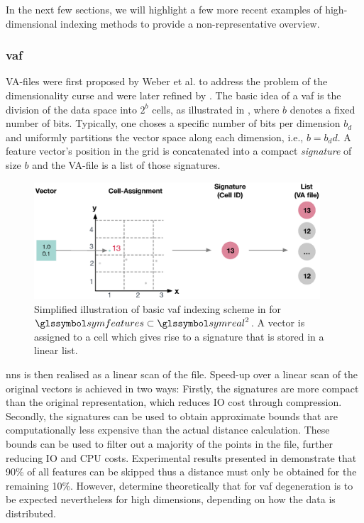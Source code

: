 In the next few sections, we will highlight a few more recent examples of high-dimensional indexing methods to provide a non-representative overview.

\subsubsection{\acrfull{vaf}}

VA-files were first proposed by Weber et al. \cite{Weber:1998Va} to address the problem of the dimensionality curse and were later refined by \cite{Ferhatosmanoglu:2000Vector}. The basic idea of a \acrshort{vaf} is the division of the data space into $2^b$ cells, as illustrated in , where $b$ denotes a fixed number of bits. Typically, one choses a specific number of bits per dimension $b_d$ and uniformly partitions the vector space along each dimension, i.e., $b = b_dd$. A feature vector's position in the grid is concatenated into a compact \emph{signature} of size $b$ and the VA-file is a list of those signatures. 

\begin{figure}[bt]
\centering
\includegraphics[width=0.95\textwidth]{figures/vaf}
\caption{Simplified illustration of basic \acrshort{vaf} indexing scheme in for $\symfeatures \subset \symreal^2$. A vector is assigned to a cell which gives rise to a signature that is stored in a linear list.}
\label{fig:vaf}
\end{figure}

\acrshort{nns} is then realised as a linear scan of the file. Speed-up over a linear scan of the original vectors is achieved in two ways: Firstly, the signatures are more compact than the original representation, which reduces IO cost through compression. Secondly, the signatures can be used to obtain approximate bounds that are computationally less expensive than the actual distance calculation. These bounds can be used to filter out a majority of the points in the file, further reducing IO and CPU costs. Experimental results presented in \cite{Weber:1998Va} demonstrate that 90\% of all features can be skipped thus a distance must only be obtained for the remaining 10\%. However, \cite{Echihabi:2021High} determine theoretically that for \acrshort{vaf} degeneration is to be expected nevertheless for high dimensions, depending on how the data is distributed.

